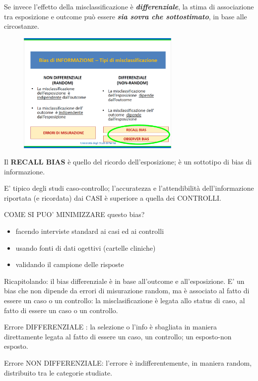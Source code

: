Se invece l'effetto della misclassificazione è
\textbf{\emph{differenziale}}, la stima di associazione tra esposizione
e outcome può essere \textbf{\emph{sia sovra che sottostimato}}, in base
alle circostanze.

\begin{figure}[!ht]
\centering
\includegraphics[width=0.7\textwidth]{05/image8.png}
\end{figure}

Il \textbf{RECALL BIAS} è quello del ricordo dell'esposizione; è un
sottotipo di bias di informazione.

E' tipico degli studi caso-controllo; l'accuratezza e l'attendibilità
dell'informazione riportata (e ricordata) dai CASI è superiore a quella
dei CONTROLLI.

COME SI PUO' MINIMIZZARE questo bias?

\begin{itemize}
\item
  facendo interviste standard ai casi ed ai controlli
\item
  usando fonti di dati ogettivi (cartelle cliniche)
\item
  validando il campione delle risposte
\end{itemize}

Ricapitolando: il bias differenziale è in base all'outcome e
all'esposizione. E' un bias che non dipende da errori di misurazione
random, ma è associato al fatto di essere un caso o un controllo: la
misclasificazione è legata allo status di caso, al fatto di essere un
caso o un controllo.

Errore DIFFERENZIALE : la selezione o l'info è sbagliata in maniera
direttamente legata al fatto di essere un caso, un controllo; un
esposto-non esposto.

Errore NON DIFFERENZIALE: l'errore è indifferentemente, in maniera
random, distribuito tra le categorie studiate.

